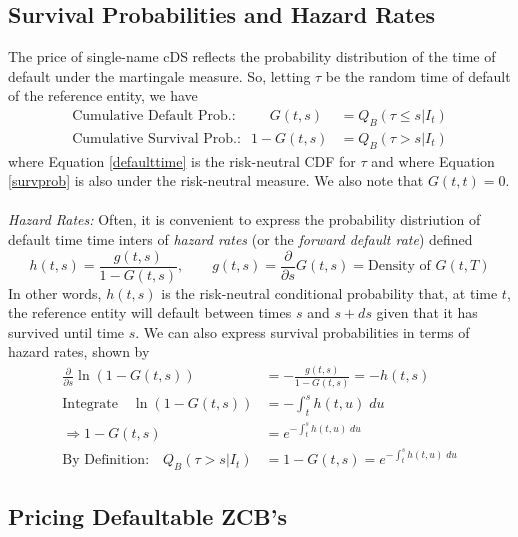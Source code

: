 \documentclass[a4paper,12pt]{scrartcl}
\begin{document}
\subsection{Survival Probabilities and Hazard Rates}

The price of single-name cDS reflects the probability distribution of 
the time of default under the martingale measure.  So, letting $\tau$
be the random time of default of the reference entity, we have 
\begin{align}
   \text{Cumulative Default Prob.}: \qquad\; G(t,s) &= 
      Q_B(\tau \leq s | I_t)\label{defaulttime}\\
   \text{Cumulative Survival Prob.}:\; \; 1-G(t,s) &= Q_B(\tau > s | I_t)
   \label{survprob}
\end{align}
where Equation \ref{defaulttime} is the risk-neutral CDF for $\tau$
and where Equation \ref{survprob} is also under the risk-neutral measure.
We also note that $G(t,t)=0$. 
\\
\\
{\sl Hazard Rates:} Often, it is convenient to express the probability
distriution of default time time inters of \emph{hazard rates} (or the
\emph{forward default rate}) defined 
\begin{equation}
   h(t,s) = \frac{g(t,s)}{1-G(t,s)}, \qquad g(t,s) = \frac{\partial}{
   \partial s} G(t,s) = \text{Density of $G(t,T)$}
\end{equation}
In other words, $h(t,s)$ is the risk-neutral conditional probability
that, at time $t$, the reference entity will default between
times $s$ and $s + ds$ given that it has survived until time $s$.
We can also express survival probabilities in terms of hazard rates, 
shown by
\begin{align*}
   \frac{\partial}{\partial s} \ln (1-G(t,s)) &= - \frac{g(t,s)}{
   1-G(t,s)} = -h(t,s)\\
   \text{Integrate}\quad \ln (1-G(t,s)) &= -\int^s_t h(t,u) \; du \\
   \Rightarrow 1-G(t,s) &= e^{-\int^s_t h(t,u) \; du} \\
   \text{By Definition:} \quad Q_B(\tau > s | I_t) &= 1-G(t,s) = 
      e^{-\int^s_t h(t,u) \; du}
\end{align*}

\newpage
\subsection{Pricing Defaultable ZCB's}
\end{document}
